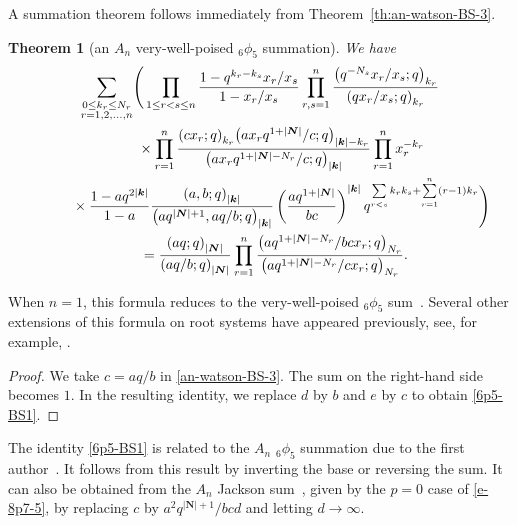 \documentclass[pdftex]{sigma}
\numberwithin{equation}{section}
\newtheorem{Theorem}{Theorem}[section]
\newenvironment{Remark*}{\begin{remark*}\normalfont}{\end{remark*}}
\newcommand{\sumN}{{\left| \boldsymbol{N} \right|}}
\newcommand\sumk{{\left| \boldsymbol{k} \right|}}
\newcommand{\multsum}[3]{{\sum\limits_{\substack{{0\le #1_#3 \le #2_#3} \\
{#3 =1,2,\dots, n}}}}}
\newcommand{\qrfac}[2]{{\left({#1}; q\right)_{#2}}} %
\newcommand{\triprod}[1]{\prod\limits_{1\le r < s \le #1}}
\newcommand{\sqprod}[1]{\prod\limits_{r, s =1}^{#1}} %
\newcommand{\smallprod}[1]{\prod\limits_{r =1}^{#1}} %
\newcommand{\xover}[1]{#1_{r}/#1_{s}}
\newcommand{\vandermonde}[3]{\triprod{#3} %
 \frac{1-q^{#2_r-#2_s} \xover {#1} }{1-\xover{#1}}
}
\begin{document}
A summation theorem follows immediately from Theorem~\ref{th:an-watson-BS-3}.
\begin{Theorem}[an $A_n$ very-well-poised $_6\phi_5$ summation] We have
\begin{gather}
\multsum{k}{N}{r} \Bigg( \vandermonde{x}{k}{n}
\sqprod n \frac{\qrfac{q^{-N_s}\xover{x}}{k_r} }{\qrfac{q\xover{x}}{k_r} } \notag \\
\qquad\quad{} \times\smallprod n \frac{\qrfac{cx_r}{k_r} \qrfac{ax_rq^{1+\sumN}/c}{\sumk-k_r}}
{\qrfac{ax_rq^{1+\sumN-N_r}/c}{\sumk} } \smallprod n x_r^{-k_r}\notag \\
\qquad\quad{} \times \frac{1-aq^{2\sumk}}{1-a} \frac{\qrfac{a, b}{\sumk}}{\qrfac{aq^{\sumN+1}, aq/b}{\sumk}}
\left(\frac{aq^{1+\sumN}}{bc}\right)^{\sumk} q^{\sum\limits_{r<s}k_rk_s+\sum\limits_{r=1}^n (r-1)k_r } \Bigg)\notag \\
\qquad{} = \frac{\qrfac{aq}{\sumN}}{\qrfac{aq/b}{\sumN}}
\smallprod n \frac{\qrfac{aq^{1+\sumN-N_r}/bcx_r}{N_r}}{\qrfac{aq^{1+\sumN-N_r}/cx_r}{N_r}} . \label{6p5-BS1}
\end{gather}
\end{Theorem}
\begin{Remark*} When $n{=}1$, this formula reduces to the very-well-poised $_6\phi_5$ sum~\cite[equa\-tion~(2.4.2)]{GR90}. Several other extensions of this formula on root systems have appeared previously, see, for example, \cite{GB1995, GB1999a, vD1997, RG1989, Milne1997, ML1995, MS2007b}.
\end{Remark*}

\begin{proof} We take $c=aq/b$ in \eqref{an-watson-BS-3}. The sum on the right-hand side becomes $1$. In the resulting identity, we replace $d$ by $b$ and $e$ by $c$ to obtain \eqref{6p5-BS1}.
\end{proof}

The identity \eqref{6p5-BS1} is related to the $A_n$ $_6\phi_5$ summation due to the first author~\cite[Theorem~3.6]{GB1995}. It follows from this result by inverting the base or reversing the sum. It can also be obtained from the $A_n$ Jackson sum~\cite[Theorem~4.1]{MS2008}, given by the $p=0$ case of \eqref{e-8p7-5}, by replacing $c$ by $a^2q^{\sumN+1}/bcd$ and letting $d\to\infty$.
\end{document}
